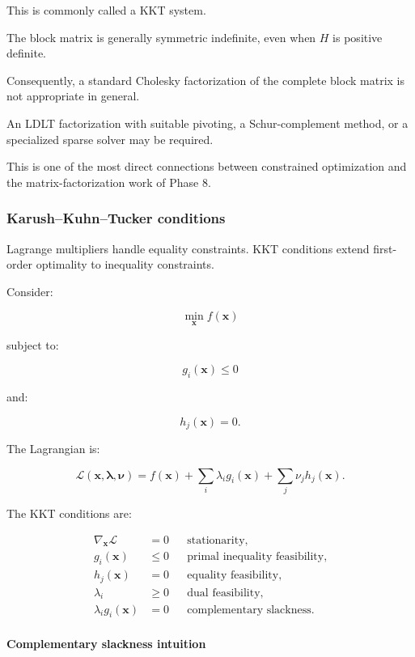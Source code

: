 This is commonly called a KKT system.

The block matrix is generally symmetric indefinite, even when \(H\) is positive definite.

Consequently, a standard Cholesky factorization of the complete block matrix is not appropriate in general.

An LDLT factorization with suitable pivoting, a Schur-complement method, or a specialized sparse solver may be required.

This is one of the most direct connections between constrained optimization and the matrix-factorization work of Phase 8.

\subsubsection{Karush--Kuhn--Tucker conditions}\label{02-foundations-ii-ch026-karushkuhntucker-conditions}

\hypertarget{02-foundations-ii-ch026-karushkuhntucker-conditions}{}

Lagrange multipliers handle equality constraints. KKT conditions extend first-order optimality to inequality constraints.

Consider:

\[
\min_{\mathbf x}f(\mathbf x)
\]

subject to:

\[
g_i(\mathbf x)\le0
\]

and:

\[
h_j(\mathbf x)=0.
\]

The Lagrangian is:

\[
\mathcal L(\mathbf x,\boldsymbol\lambda,\boldsymbol\nu) = f(\mathbf x)+ \sum_i\lambda_i g_i(\mathbf x)+ \sum_j\nu_jh_j(\mathbf x).
\]

The KKT conditions are:

\[
\boxed{ \begin{aligned} \nabla_{\mathbf x}\mathcal L&=0 &&\text{stationarity},\\ g_i(\mathbf x)&\le0 &&\text{primal inequality feasibility},\\ h_j(\mathbf x)&=0 &&\text{equality feasibility},\\ \lambda_i&\ge0 &&\text{dual feasibility},\\ \lambda_i g_i(\mathbf x)&=0 &&\text{complementary slackness}. \end{aligned} }
\]

\paragraph{Complementary slackness intuition}\label{02-foundations-ii-ch026-complementary-slackness-intuition}

